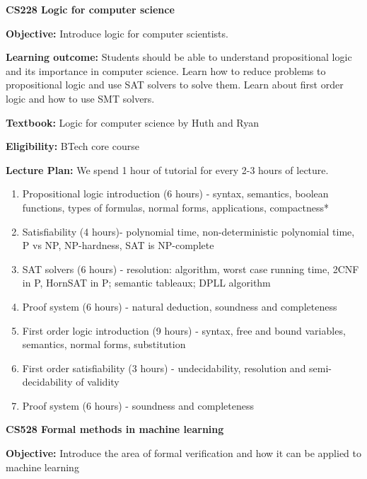 \documentclass[12pt, a4paper]{letter} %
\begin{document}
\newpage

\begin{center}
    \textbf{CS228 Logic for computer science}
\end{center}
\textbf{Objective:} Introduce logic for computer scientists.

\textbf{Learning outcome:} Students should be able to understand propositional logic and its importance in computer science. Learn how to reduce problems to propositional logic and use SAT solvers to solve them. Learn about first order logic and how to use SMT solvers.

\textbf{Textbook:} Logic for computer science by Huth and Ryan

\textbf{Eligibility:} BTech core course



\textbf{Lecture Plan:}
We spend 1 hour of tutorial for every 2-3 hours of lecture.
\begin{enumerate}
\item Propositional logic introduction (6 hours) - syntax, semantics, boolean functions, types of formulas, normal forms, applications, compactness*
\item Satisfiability (4 hours)- polynomial time, non-deterministic polynomial time, P vs NP, NP-hardness, SAT is NP-complete
\item SAT solvers (6 hours) - resolution: algorithm, worst case running time, 2CNF in P, HornSAT in P; semantic tableaux; DPLL algorithm
\item Proof system (6 hours) - natural deduction, soundness and completeness
\item First order logic introduction (9 hours) - syntax, free and bound variables, semantics, normal forms, substitution
\item First order satisfiability (3 hours) - undecidability, resolution and semi-decidability of validity
\item Proof system (6 hours) - soundness and completeness
\end{enumerate}

\newpage
\begin{center}
    \textbf{CS528 Formal methods in machine learning}
\end{center}
\textbf{Objective:} Introduce the area of formal verification and how it can be applied to machine learning
\end{document}
